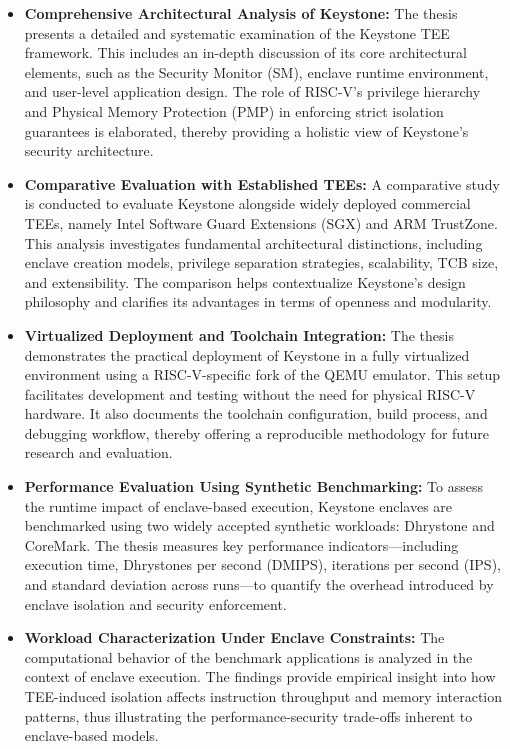 \begin{itemize}
\item \textbf{Comprehensive Architectural Analysis of Keystone:}
The thesis presents a detailed and systematic examination of the Keystone TEE framework. This includes an in-depth discussion of its core architectural elements, such as the Security Monitor (SM), enclave runtime environment, and user-level application design. The role of RISC-V’s privilege hierarchy and Physical Memory Protection (PMP) in enforcing strict isolation guarantees is elaborated, thereby providing a holistic view of Keystone’s security architecture.
\item \textbf{Comparative Evaluation with Established TEEs:}  
A comparative study is conducted to evaluate Keystone alongside widely deployed commercial TEEs, namely Intel Software Guard Extensions (SGX) and ARM TrustZone. This analysis investigates fundamental architectural distinctions, including enclave creation models, privilege separation strategies, scalability, TCB size, and extensibility. The comparison helps contextualize Keystone’s design philosophy and clarifies its advantages in terms of openness and modularity.

\item \textbf{Virtualized Deployment and Toolchain Integration:}  
The thesis demonstrates the practical deployment of Keystone in a fully virtualized environment using a RISC-V-specific fork of the QEMU emulator. This setup facilitates development and testing without the need for physical RISC-V hardware. It also documents the toolchain configuration, build process, and debugging workflow, thereby offering a reproducible methodology for future research and evaluation.

\item \textbf{Performance Evaluation Using Synthetic Benchmarking:}  
To assess the runtime impact of enclave-based execution, Keystone enclaves are benchmarked using two widely accepted synthetic workloads: Dhrystone and CoreMark. The thesis measures key performance indicators—including execution time, Dhrystones per second (DMIPS), iterations per second (IPS), and standard deviation across runs—to quantify the overhead introduced by enclave isolation and security enforcement.

\item \textbf{Workload Characterization Under Enclave Constraints:}  
The computational behavior of the benchmark applications is analyzed in the context of enclave execution. The findings provide empirical insight into how TEE-induced isolation affects instruction throughput and memory interaction patterns, thus illustrating the performance-security trade-offs inherent to enclave-based models.
\end{itemize}

